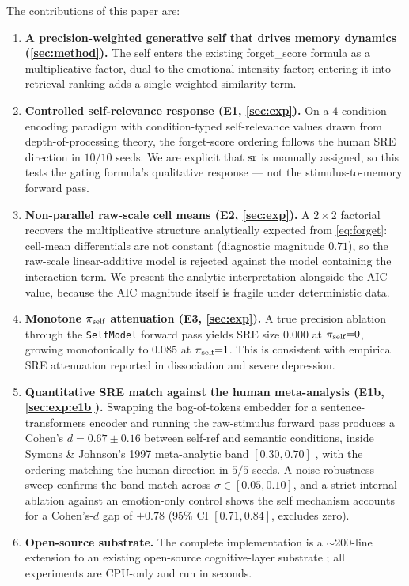 The contributions of this paper are:

\begin{enumerate}[leftmargin=*,itemsep=2pt,topsep=2pt]
\item \textbf{A precision-weighted generative self that drives memory
dynamics (\cref{sec:method}).} The self enters the existing
forget\_score formula as a multiplicative factor, dual to the emotional
intensity factor; entering it into retrieval ranking adds a single
weighted similarity term.
\item \textbf{Controlled self-relevance response (E1, \cref{sec:exp}).}
On a $4$-condition encoding paradigm with condition-typed self-relevance
values drawn from depth-of-processing theory, the forget-score ordering
follows the human SRE direction in $10/10$ seeds.
We are explicit that $\mathrm{sr}$ is manually assigned, so this tests the
gating formula's qualitative response --- not the stimulus-to-memory
forward pass.
\item \textbf{Non-parallel raw-scale cell means (E2, \cref{sec:exp}).}
A $2{\times}2$ factorial recovers the multiplicative structure analytically
expected from \cref{eq:forget}: cell-mean differentials are not constant
(diagnostic magnitude $0.71$), so the raw-scale linear-additive model is
rejected against the model containing the interaction term. We present the
analytic interpretation alongside the AIC value, because the AIC magnitude
itself is fragile under deterministic data.
\item \textbf{Monotone $\pi_{\text{self}}$ attenuation (E3, \cref{sec:exp}).} A
true precision ablation through the \texttt{SelfModel} forward pass
yields SRE size $0.000$ at $\pi_{\text{self}}{=}0$, growing monotonically to
$0.085$ at $\pi_{\text{self}}{=}1$. This is consistent with empirical SRE
attenuation reported in dissociation and severe depression.
\item \textbf{Quantitative SRE match against the human meta-analysis
(E1b, \cref{sec:exp:e1b}).} Swapping the bag-of-tokens embedder for
a sentence-transformers encoder \cite{reimers2019sbert} and running
the raw-stimulus forward pass produces a Cohen's $d = 0.67 \pm 0.16$
between self-ref and semantic conditions, inside Symons \& Johnson's
1997 meta-analytic band $[0.30, 0.70]$ \cite{symons1997meta}, with
the ordering matching the human direction in $5/5$ seeds. A
noise-robustness sweep confirms the band match across
$\sigma \in [0.05, 0.10]$, and a strict internal ablation against
an emotion-only control shows the self mechanism accounts for a
Cohen's-$d$ gap of $+0.78$ (95\% CI $[0.71, 0.84]$, excludes zero).
\item \textbf{Open-source substrate.} The complete implementation is a
$\sim$200-line extension to an existing open-source cognitive-layer
substrate \cite{anon_substrate}; all experiments are CPU-only and
run in seconds.
\end{enumerate}

